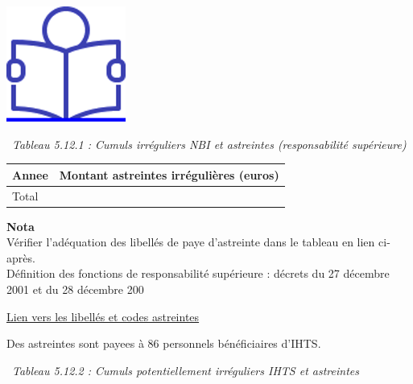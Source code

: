 \href{../Docs/Notices/fiche_astreintes.odt}{\includegraphics{icones/Notice.png}}

~\emph{Tableau 5.12.1 : Cumuls irréguliers NBI et astreintes
(responsabilité supérieure)}

\begin{longtable}[]{@{}ll@{}}
\toprule
Annee & Montant astreintes irrégulières (euros)\tabularnewline
\midrule
\endhead
Total &\tabularnewline
\bottomrule
\end{longtable}

\textbf{Nota}\\
Vérifier l'adéquation des libellés de paye d'astreinte dans le tableau
en lien ci-après.\\
Définition des fonctions de responsabilité supérieure : décrets du 27
décembre 2001 et du 28 décembre 200

\href{../Bases/Reglementation/libelles.astreintes.csv}{Lien vers les
libellés et codes astreintes}

Des astreintes sont payees à 86 personnels bénéficiaires d'IHTS.

~\emph{Tableau 5.12.2 : Cumuls potentiellement irréguliers IHTS et
astreintes}

